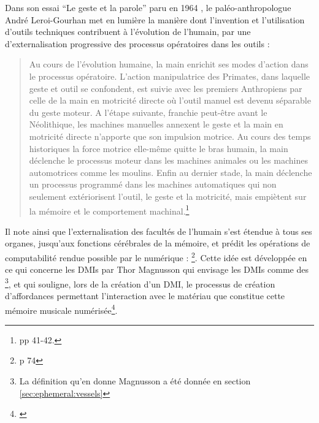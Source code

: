 \noindent Dans son essai ``Le geste et la parole'' paru en 1964 \cite{leroi-gourhan_geste_1964}, le paléo-anthropologue André Leroi-Gourhan met en lumière la manière dont l'invention et l'utilisation d'outils techniques contribuent à l'évolution de l'humain, par une d'externalisation progressive des processus opératoires dans les outils :
\vspace{-1em}
\begin{quotation}
	Au cours de l’évolution humaine, la main enrichit ses modes d’action dans le processus opératoire. L’action manipulatrice des Primates, dans laquelle geste et outil se confondent, est suivie avec les premiers Anthropiens par celle de la main en motricité directe où l’outil manuel est devenu séparable du geste moteur. A l’étape suivante, franchie peut-être avant le Néolithique, les machines manuelles annexent le geste et la main en motricité directe n’apporte que son impulsion motrice. Au cours des temps historiques la force motrice elle-même quitte le bras humain, la main déclenche le processus moteur dans les machines animales ou les machines automotrices comme les moulins. Enfin au dernier stade, la main déclenche un processus programmé dans les machines automatiques qui non seulement extériorisent l’outil, le geste et la motricité, mais empiètent sur la mémoire et le comportement machinal.\footnote{\cite{leroi-gourhan_geste_1964} pp 41-42.}
\end{quotation}
\indent Il note ainsi que l’externalisation des facultés de l'humain s’est étendue à tous ses organes, jusqu'aux fonctions cérébrales de la mémoire, et prédit les opérations de computabilité rendue possible par le numérique :
\footnote{\cite{leroi-gourhan_geste_1964} p 74}. Cette idée est développée en ce qui concerne les \glspl{DMI} par Thor Magnusson qui envisage les \glspl{DMI} comme des \footnote{La définition qu'en donne Magnusson a été donnée en section \ref{sec:ephemeral:vessels}}, et qui souligne, lors de la création d'un \gls{DMI}, le processus de création d'affordances permettant l'interaction avec le matériau que constitue cette mémoire musicale numérisée\footnote{ \cite{magnusson_epistemic_2009}}.

